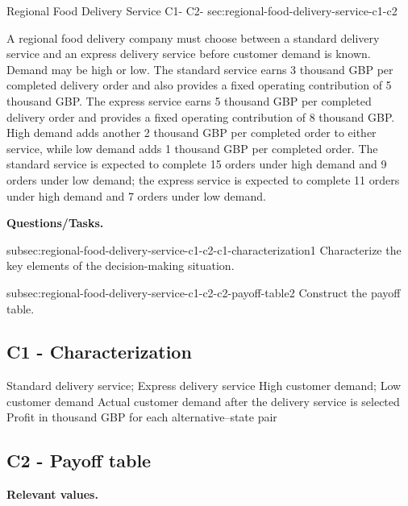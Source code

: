 		\sectionScored
	{Regional Food Delivery Service}
	{C1- \hspace{2mm} C2-}
	{sec:regional-food-delivery-service-c1-c2}
	{
		A regional food delivery company must choose between a standard delivery service and an express delivery service before customer demand is known. Demand may be high or low. The standard service earns 3 thousand GBP per completed delivery order and also provides a fixed operating contribution of 5 thousand GBP. The express service earns 5 thousand GBP per completed delivery order and provides a fixed operating contribution of 8 thousand GBP. High demand adds another 2 thousand GBP per completed order to either service, while low demand adds 1 thousand GBP per completed order. The standard service is expected to complete 15 orders under high demand and 9 orders under low demand; the express service is expected to complete 11 orders under high demand and 7 orders under low demand.
		
		\textbf{Questions/Tasks.}
		\begin{enumerate}
			\CriterionTask
			{subsec:regional-food-delivery-service-c1-c2-c1-characterization}{1}
			{Characterize the key elements of the decision-making situation. }
			
			\CriterionTask
			{subsec:regional-food-delivery-service-c1-c2-c2-payoff-table}{2}
			{Construct the payoff table. }
		\end{enumerate}
		
		\label{subsec:regional-food-delivery-service-c1-c2-c1-characterization}
		\subsection*{C1 - Characterization }
		
		\DecisionElementsTable
		{Standard delivery service; Express delivery service}
		{High customer demand; Low customer demand}
		{Actual customer demand after the delivery service is selected}
		{Profit in thousand GBP for each alternative--state pair}
		
		\label{subsec:regional-food-delivery-service-c1-c2-c2-payoff-table}
		\subsection*{C2 - Payoff table }
		
		\textbf{Relevant values.}
		
}
